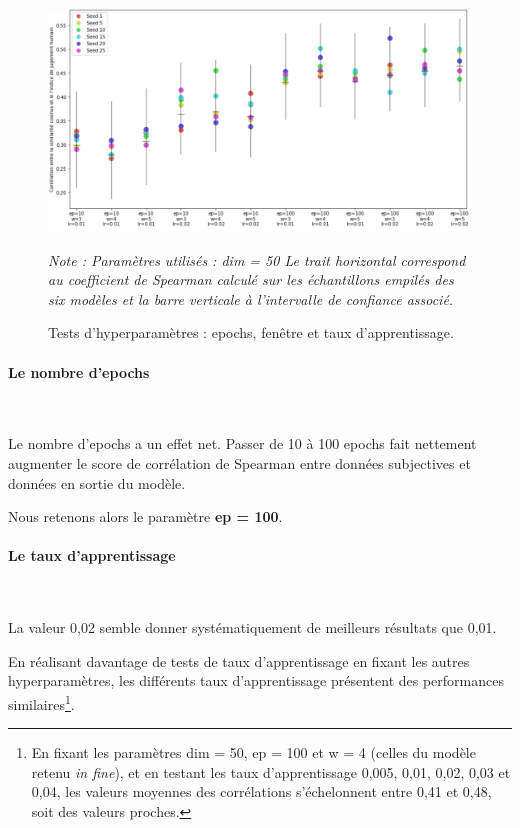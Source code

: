 \documentclass[11pt,french,french]{article}
\let\rmarkdownfootnote\footnote%
\def\footnote{\protect\rmarkdownfootnote}
\begin{document}
\begin{figure}[htp]
\begin{center}
\includegraphics[width=1\textwidth]{img/test_parametres.png}
\captionsetup{margin=0cm,format=hang,justification=justified}
\caption{Tests d'hyperparamètres : epochs, fenêtre et taux d'apprentissage.}\label{fig:evaluation_1}
\end{center}
\vspace{-0.3cm}
\footnotesize
\emph{Note : Paramètres utilisés : dim = 50\newline
Le trait horizontal correspond au coefficient de Spearman calculé sur les échantillons empilés des six modèles et la barre verticale à l'intervalle de confiance associé.}
\end{figure}

\paragraph{Le nombre d'epochs}\label{le-nombre-depochs}

~

Le nombre d'epochs a un effet net. Passer de 10 à 100 epochs fait
nettement augmenter le score de corrélation de Spearman entre données
subjectives et données en sortie du modèle.

\faArrowCircleRight{} Nous retenons alors le paramètre \textbf{ep =
100}.

\paragraph{Le taux d'apprentissage}\label{le-taux-dapprentissage}

~

La valeur 0,02 semble donner systématiquement de meilleurs résultats que
0,01.

En réalisant davantage de tests de taux d'apprentissage en fixant les
autres hyperparamètres, les différents taux d'apprentissage présentent
des performances similaires\footnote{En fixant les paramètres dim = 50,
  ep = 100 et w = 4 (celles du modèle retenu \emph{in fine}), et en
  testant les taux d'apprentissage 0,005, 0,01, 0,02, 0,03 et 0,04, les
  valeurs moyennes des corrélations s'échelonnent entre 0,41 et 0,48,
  soit des valeurs proches.}.
\end{document}
